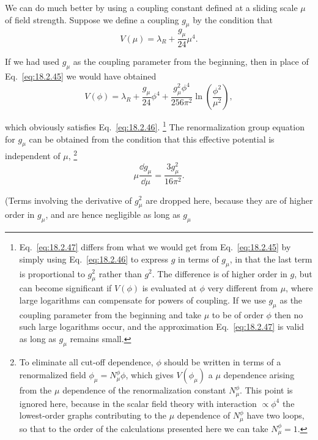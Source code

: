 We can do much better by using a coupling constant defined at a sliding scale
$\mu$ of field strength. Suppose we define a coupling $g_\mu$ by the condition
that
\begin{equation}
V(\mu)=\lambda_R+\frac{g_\mu}{24}\mu^4.
\tag{18.2.46}\label{eq:18.2.46}
\end{equation}
\par\noindent
If we had used $g_\mu$ as the coupling parameter from the beginning, then in
place of Eq.~\eqref{eq:18.2.45} we would have obtained
\begin{equation}
V(\phi)=\lambda_R+\frac{g_\mu}{24}\phi^4
+\frac{g_\mu^2\phi^4}{256\pi^2}\ln\left(\frac{\phi^2}{\mu^2}\right),
\tag{18.2.47}\label{eq:18.2.47}
\end{equation}
\par\noindent
which obviously satisfies Eq.~\eqref{eq:18.2.46}.
\footnote{Eq.~\eqref{eq:18.2.47} differs from what we would get from
Eq.~\eqref{eq:18.2.45} by simply using Eq.~\eqref{eq:18.2.46} to express $g$
in terms of $g_\mu$, in that the last term is proportional to $g_\mu^2$ rather
than $g^2$. The difference is of higher order in $g$, but can become
significant if $V(\phi)$ is evaluated at $\phi$ very different from $\mu$,
where large logarithms can compensate for powers of coupling. If we use
$g_\mu$ as the coupling parameter from the beginning and take $\mu$ to be of
order $\phi$ then no such large logarithms occur, and the approximation
Eq.~\eqref{eq:18.2.47} is valid as long as $g_\mu$ remains small.}
The renormalization group equation for $g_\mu$ can be obtained from the
condition that this effective potential is independent of $\mu$,
\footnote{To eliminate all cut-off dependence, $\phi$ should be written in
terms of a renormalized field $\phi_\mu=N_\mu^\phi\phi$, which gives
$V(\phi_\mu)$ a $\mu$ dependence arising from the $\mu$ dependence of the
renormalization constant $N_\mu^\phi$. This point is ignored here, because in
the scalar field theory with interaction $\propto\phi^4$ the
lowest-order graphs contributing to the $\mu$ dependence of $N_\mu^\phi$ have
two loops, so that to the order of the calculations presented here we can
take $N_\mu^\phi=1$.}
\begin{equation}
\mu\frac{\dd g_\mu}{\dd\mu}=\frac{3g_\mu^2}{16\pi^2}.
\tag{18.2.48}\label{eq:18.2.48}
\end{equation}
\par\noindent
(Terms involving the derivative of $g_\mu^2$ are dropped here, because they
are of higher order in $g_\mu$, and are hence negligible as long as $g_\mu$
